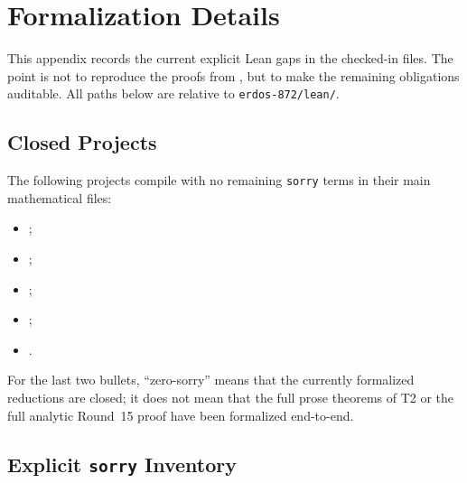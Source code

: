 \section{Formalization Details}\label{app:formalization}

This appendix records the current explicit Lean gaps in the checked-in files.
The point is not to reproduce the proofs from ,
but to make the remaining obligations auditable.  All paths below are relative
to \texttt{erdos-872/lean/}.

\subsection{Closed Projects}

The following projects compile with no remaining \texttt{sorry} terms in their
main mathematical files:
\begin{itemize}
  \item {};
  \item {};
  \item {};
  \item {};
  \item {}.
\end{itemize}

For the last two bullets, ``zero-sorry'' means that the currently formalized
reductions are closed; it does not mean that the full prose theorems of T2 or
the full analytic Round~15 proof have been formalized end-to-end.

\subsection{Explicit \texttt{sorry} Inventory}

